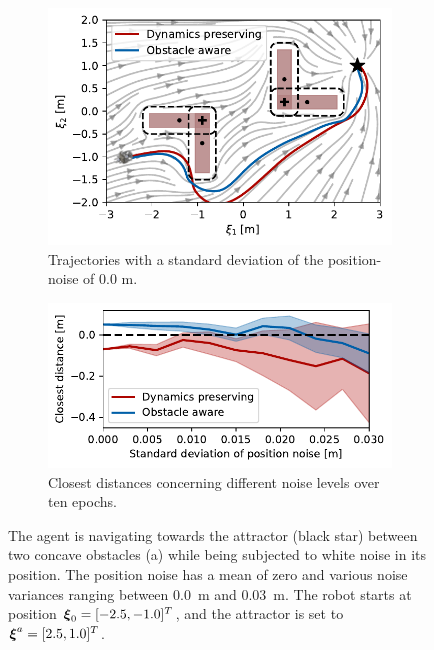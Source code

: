 \begin{figure}[htbp]
    \centering
    \begin{subfigure}{\columnwidth}
      \centerline{\includegraphics[width=\textwidth]{figures/trajectory_position_noise}}
      \caption{Trajectories with a standard deviation of the position-noise of 0.0 m.}
      \label{fig:trajectory_position_noise}
    \end{subfigure}
    \begin{subfigure}{\columnwidth}
    \includegraphics[width=\textwidth]{figures/comparison_position_noise}
      \caption{Closest distances concerning different noise levels over ten epochs.}
      \label{fig:comparison_position_noise}
    \end{subfigure}
	\caption{
 The agent is navigating towards the attractor (black star) between two concave obstacles (a) while being subjected to white noise in its position. The position noise has a mean of zero and various noise variances ranging between \qty{0.0}{m} and \qty{0.03}{m}. The robot starts at position $\boldsymbol{\xi}_0 = [-2.5, -1.0]^T$, and the attractor is set to $\boldsymbol{\xi}^a = [2.5, 1.0]^T$.
 }
\label{fig:position_noise}
\end{figure}


